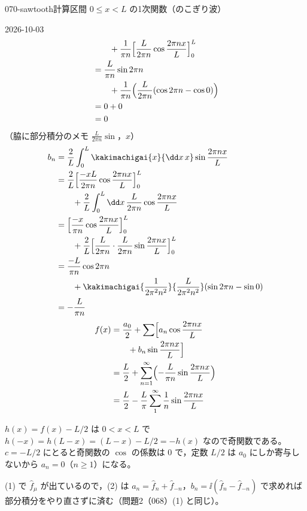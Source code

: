 \documentclass[uplatex,dvipdfmx,a4paper,11pt]{jsarticle}
\begin{document}
\begin{mondai}{070-sawtooth}{計算}{区間 $0\le x<L$ の1次関数（のこぎり波）}
\begin{kotaeutsushi}{2026-10-03}
\begin{align*}
  &\qquad+\frac{1}{\pi n}\Bigl[\frac{L}{2\pi n}\cos\frac{2\pi nx}{L}\Bigr]_{0}^{L}\\
  &=\frac{L}{\pi n}\sin2\pi n\\
  &\qquad+\frac{1}{\pi n}\Bigl(\frac{L}{2\pi n}(\cos2\pi n-\cos0)\Bigr)\\
  &=0+0\\
  &=0
\end{align*}
（脇に部分積分のメモ $\frac{L}{2\pi n}\sin$，$x$）
\begin{align*}
  b_n&=\frac{2}{L}\int_{0}^{L}\kakimachigai{x}{\dd x\,x}\sin\frac{2\pi nx}{L}\\
  &=\frac{2}{L}\Bigl[\frac{-xL}{2\pi n}\cos\frac{2\pi nx}{L}\Bigr]_{0}^{L}\\
  &\qquad+\frac{2}{L}\int_{0}^{L}\dd x\,\frac{L}{2\pi n}\cos\frac{2\pi nx}{L}\\
  &=\Bigl[\frac{-x}{\pi n}\cos\frac{2\pi nx}{L}\Bigr]_{0}^{L}\\
  &\qquad+\frac{2}{L}\Bigl[\frac{L}{2\pi n}\cdot\frac{L}{2\pi n}\sin\frac{2\pi nx}{L}\Bigr]_{0}^{L}\\
  &=\frac{-L}{\pi n}\cos2\pi n\\
  &\qquad+\kakimachigai{\frac{1}{2\pi^{2}n^{2}}}{\frac{L}{2\pi^{2}n^{2}}}(\sin2\pi n-\sin0)\\
  &=-\frac{L}{\pi n}
\end{align*}
\begin{align*}
  f(x)&=\frac{a_0}{2}+\sum\Bigl[a_n\cos\frac{2\pi nx}{L}\\
  &\qquad+b_n\sin\frac{2\pi nx}{L}\Bigr]\\
  &=\frac{L}{2}+\sum_{n=1}^{\infty}\Bigl(-\frac{L}{\pi n}\sin\frac{2\pi nx}{L}\Bigr)\\
  &=\frac{L}{2}-\frac{L}{\pi}\sum_{1}^{\infty}\frac{1}{n}\sin\frac{2\pi nx}{L}
\end{align*}
\mikai
\end{kotaeutsushi}
\begin{kizuki}
\item $h(x)=f(x)-L/2$ は $0<x<L$ で $h(-x)=h(L-x)=(L-x)-L/2=-h(x)$ なので奇関数である。$c=-L/2$ にとると奇関数の $\cos$ の係数は 0 で，定数 $L/2$ は $a_0$ にしか寄与しないから $a_n=0$（$n\ge1$）になる。
\item (1) で $\hat{f}_{\mu}$ が出ているので，(2) は $a_n=\hat{f}_n+\hat{f}_{-n}$，$b_n=\ii(\hat{f}_n-\hat{f}_{-n})$ で求めれば部分積分をやり直さずに済む（問題2（068）(1) と同じ）。
\end{kizuki}
\begin{tadashii}

\end{tadashii}
\end{mondai}
\end{document}
